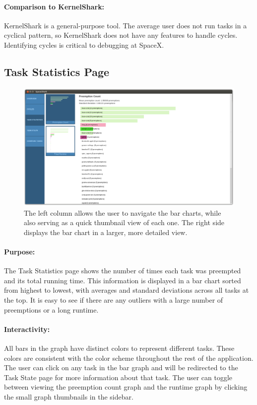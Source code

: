 \documentclass{hmcclinic}
\begin{document}
\paragraph{Comparison to KernelShark:}
    KernelShark is a general-purpose tool. The average user does not run tasks
    in a cyclical pattern, so KernelShark does not have any features to handle
    cycles. Identifying cycles is critical to debugging at SpaceX.
    
  \subsection{Task Statistics Page} %

  \begin{figure}[H]
  \includegraphics[width=5in]{task-statistics-page.png}
  \caption{The left column allows the user to navigate the bar charts, while
    also serving as a quick thumbnail view of each one. The right side displays
  the bar chart in a larger, more detailed view.}
  \end{figure}

\paragraph{Purpose:}
The Task Statistics page shows the number of times each task was preempted and
its total running time. This information is displayed in a bar chart sorted from
highest to lowest, with averages and standard deviations across all tasks at the
top. It is easy to see if there are any outliers with a large number of
preemptions or a long runtime.

\paragraph{Interactivity:}
All bars in the graph have distinct colors to represent different tasks. These
colors are consistent with the color scheme throughout the rest of the
application. The user can click on any task in the bar graph and will be
redirected to the Task State page for more information about that task.
The user can toggle between viewing the preemption count graph and the runtime
graph by clicking the small graph thumbnails in the sidebar.
\end{document}
